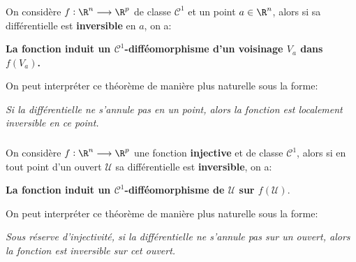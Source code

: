 \subsection*{}
On considère \(f : \R^n \longrightarrow \R^p\) de classe \(\mathcal{C}^1\) et un point \(a \in \R^n\), alors si sa différentielle est \textbf{inversible} en \(a\), on a:
\begin{center}
   \textbf{La fonction induit un \(\mathcal{C}^1\)-difféomorphisme d'un voisinage \(V_a\) dans \(f(V_a)\).}
\end{center}
On peut interpréter ce théorème de manière plus naturelle sous la forme:
\begin{center}
   \textit{Si la différentielle ne s'annule pas en un point, alors la fonction est localement inversible en ce point.}
\end{center}

\subsection*{}
On considère \(f : \R^n \longrightarrow \R^p\) une fonction \textbf{injective} et de classe \(\mathcal{C}^1\), alors si en tout point d'un ouvert \(\mathcal{U}\) sa différentielle est \textbf{inversible}, on a:
\begin{center}
   \textbf{La fonction induit un \(\mathcal{C}^1\)-difféomorphisme de \(\mathcal{U}\) sur \(f(\mathcal{U}).\)}
\end{center}
On peut interpréter ce théorème de manière plus naturelle sous la forme:
\begin{center}
   \textit{Sous réserve d'injectivité, si la différentielle ne s'annule pas sur un ouvert, alors la fonction est inversible sur cet ouvert.}
\end{center}

\subsection*{}


\subsection*{}

\chapter*{}

